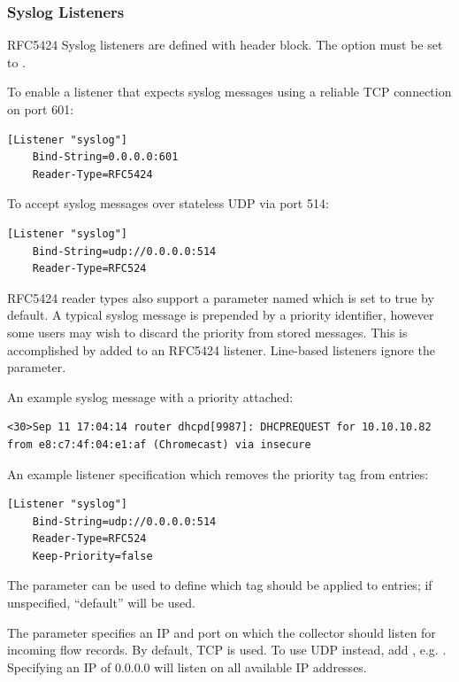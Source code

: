 \subsubsection*{Syslog Listeners}

RFC5424 Syslog listeners are defined with header block. The  option must be
set to .

To enable a listener that expects syslog messages using a reliable TCP
connection on port 601:

\begin{Verbatim}[breaklines=true]
[Listener "syslog"]
    Bind-String=0.0.0.0:601
    Reader-Type=RFC5424
\end{Verbatim}

To accept syslog messages over stateless UDP via port 514:

\begin{Verbatim}[breaklines=true]
[Listener "syslog"]
    Bind-String=udp://0.0.0.0:514
    Reader-Type=RFC524
\end{Verbatim}

RFC5424 reader types also support a parameter named
 which is set to true by default. A typical syslog
message is prepended by a priority identifier, however some users may
wish to discard the priority from stored messages. This is accomplished
by added  to an RFC5424 listener. Line-based listeners ignore the  parameter.

An example syslog message with a priority attached:

\begin{Verbatim}[breaklines=true]
<30>Sep 11 17:04:14 router dhcpd[9987]: DHCPREQUEST for 10.10.10.82 from e8:c7:4f:04:e1:af (Chromecast) via insecure
\end{Verbatim}

An example listener specification which removes the priority tag from
entries:

\begin{Verbatim}[breaklines=true]
[Listener "syslog"]
    Bind-String=udp://0.0.0.0:514
    Reader-Type=RFC524
    Keep-Priority=false
\end{Verbatim}

The  parameter can be used to define which tag should be
applied to entries; if unspecified, ``default'' will be used.

The  parameter specifies an IP and port on which
the collector should listen for incoming flow records. By default, TCP is used.
To use UDP instead, add , e.g. .
Specifying an IP of 0.0.0.0 will listen on all available IP addresses.

